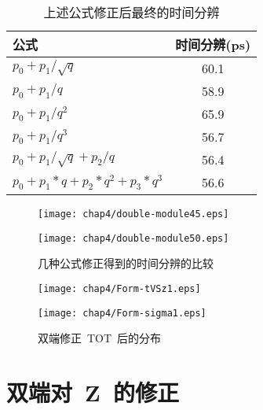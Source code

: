\begin{table}[h]
    \centering
    \caption{\label{tbl:combined-resolution} 上述公式修正后最终的时间分辨}
  \footnotesize
    \begin{tabular}{lc}
        \hline
        公式& 时间分辨(ps) \\
        \hline
        ${p_{0}+p_{1}/\sqrt{q}}$ & 60.1 \\
        ${p_{0}+p_{1}/q}$ & 58.9 \\
        ${p_{0}+p_{1}/q^{2}}$ & 65.9 \\
        ${p_{0}+p_{1}/q^{3}}$ & 56.7 \\
        ${p_{0}+p_{1}/\sqrt{q}+p_{2}/q}$ & 56.4 \\
        ${p_{0}+p_{1}*q+p_{2}*q^{2}+p_{3}*q^3}$ & 56.6 \\
        \hline
    \end{tabular}
\end{table}

\begin{figure}[!h]
\begin{minipage}[!h]{0.5\linewidth}
\texttt{[image: chap4/double-module45.eps]}
\label{fig:double-module45}
\end{minipage}%
\hfill
\begin{minipage}[!h]{0.5\linewidth}
\texttt{[image: chap4/double-module50.eps]}
\label{fig:double-module50}
\end{minipage}
\caption{几种公式修正得到的时间分辨的比较}
\end{figure}

\begin{figure}[!h]
\begin{minipage}[!h]{0.5\linewidth}
\texttt{[image: chap4/Form-tVSz1.eps]}
\label{fig:Form-tVSz1}
\end{minipage}%
\hfill
\begin{minipage}[!h]{0.5\linewidth}
\texttt{[image: chap4/Form-sigma1.eps]}
\label{fig:Form-sigma1}
\end{minipage}
\caption{双端修正~TOT~后的分布}
\end{figure}

\section{双端对~Z~的修正}

